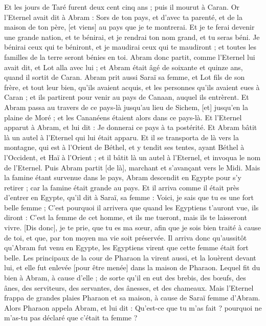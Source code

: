 \begin{multicols}{2}
Et les jours de Taré furent deux cent cinq ans ; puis il mourut à Caran.
\VerseOne{}Or l'Eternel avait dit à Abram : Sors de ton pays, et d'avec ta parenté, et de la maison de ton père, [et viens] au pays que je te montrerai.
Et je te ferai devenir une grande nation, et te bénirai, et je rendrai ton nom grand, et tu seras béni.
Je bénirai ceux qui te béniront, et je maudirai ceux qui te maudiront ; et toutes les familles de la terre seront bénies en toi.
Abram donc partit, comme l'Eternel lui avait dit, et Lot alla avec lui ; et Abram était âgé de soixante et quinze ans, quand il sortit de Caran.
Abram prit aussi Saraï sa femme, et Lot fils de son frère, et tout leur bien, qu'ils avaient acquis, et les personnes qu'ils avaient eues à Caran ; et ils partirent pour venir au pays de Canaan, auquel ils entrèrent.
Et Abram passa au travers de ce pays-là jusqu'au lieu de Sichem, [et] jusqu'en la plaine de Moré ; et les Cananéens étaient alors dans ce pays-là.
Et l'Eternel apparut à Abram, et lui dit : Je donnerai ce pays à ta postérité. Et Abram bâtit là un autel à l'Eternel qui lui était apparu.
Et il se transporta de là vers la montagne, qui est à l'Orient de Béthel, et y tendit ses tentes, ayant Béthel à l'Occident, et Haï à l'Orient ; et il bâtit là un autel à l'Eternel, et invoqua le nom de l'Eternel.
Puis Abram partit [de là], marchant et s'avançant vers le Midi.
Mais la famine étant survenue dans le pays, Abram descendit en Egypte pour s'y retirer ; car la famine était grande au pays.
Et il arriva comme il était près d'entrer en Egypte, qu'il dit à Saraï, sa femme : Voici, je sais que tu es une fort belle femme ;
C'est pourquoi il arrivera que quand les Egyptiens t'auront vue, ils diront : C'est la femme de cet homme, et ils me tueront, mais ils te laisseront vivre.
[Dis donc], je te prie, que tu es ma sœur, afin que je sois bien traité à cause de toi, et que, par ton moyen ma vie soit préservée.
Il arriva donc qu'aussitôt qu'Abram fut venu en Egypte, les Egyptiens virent que cette femme était fort belle.
Les principaux de la cour de Pharaon la virent aussi, et la louèrent devant lui, et elle fut enlevée [pour être menée] dans la maison de Pharaon.
Lequel fit du bien à Abram, à cause d'elle ; de sorte qu'il en eut des brebis, des bœufs, des ânes, des serviteurs, des servantes, des ânesses, et des chameaux.
Mais l'Eternel frappa de grandes plaies Pharaon et sa maison, à cause de Saraï femme d'Abram.
Alors Pharaon appela Abram, et lui dit : Qu'est-ce que tu m'as fait ? pourquoi ne m'as-tu pas déclaré que c'était ta femme ?

\end{multicols}
